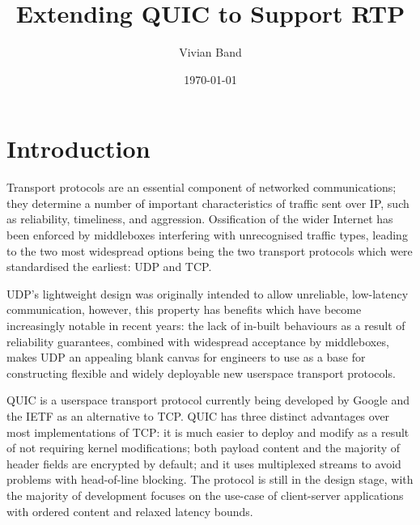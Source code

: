 \documentclass{mprop}
\begin{document}
\title{Extending QUIC to Support RTP}
\author{Vivian Band}
\date{\today}
\maketitle

\tableofcontents
\newpage

\section{Introduction}\label{intro}


Transport protocols are an essential component of networked communications; they determine a 
number of important characteristics of traffic sent over IP, such as reliability, timeliness, and 
aggression. Ossification of the wider Internet has been enforced by middleboxes interfering with 
unrecognised traffic types, leading to the two most widespread options being the two transport 
protocols which were standardised the earliest: UDP and TCP. 

UDP's lightweight design was originally intended to allow unreliable, low-latency communication, 
however, this property has benefits which have become increasingly notable in recent years: the 
lack of in-built behaviours as a result of reliability guarantees, combined with widespread 
acceptance by middleboxes, makes UDP an appealing blank canvas for engineers to use as a base for 
constructing flexible and widely deployable new userspace transport protocols.

QUIC is a userspace transport protocol currently being developed by Google and the IETF as an 
alternative to TCP. QUIC has three distinct advantages over most implementations of TCP: it is 
much easier to deploy and modify as a result of not requiring kernel modifications; both payload 
content and the majority of header fields are encrypted by default; and it uses multiplexed 
streams to avoid problems with head-of-line blocking. The protocol is still in the design stage, 
with the majority of development focuses on the use-case of client-server applications with 
ordered content and relaxed latency bounds.
\end{document}
